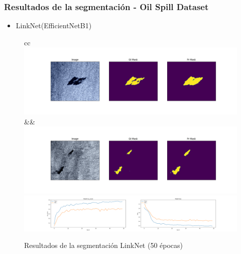 \begin{frame}
\frametitle{Resultados de la segmentación - Oil Spill Dataset}
\begin{itemize}
    \item LinkNet(EfficientNetB1)
\end{itemize}
\begin{figure}
    \centering
    \begin{tabular}{cc}
         \includegraphics[scale=0.15]{img/section_06/linknet50/efficientnetb3_resultado103.png}&&
         \includegraphics[scale=0.15]{img/section_06/linknet50/efficientnetb3_resultado37.png}\\
         \includegraphics[scale=0.12]{img/section_06/linknet50/efficientnetb3_training_results.png}
    \end{tabular}
    \caption{Resultados de la segmentación LinkNet (50 épocas)}
    \label{fig:my_label}
\end{figure}
\end{frame}

